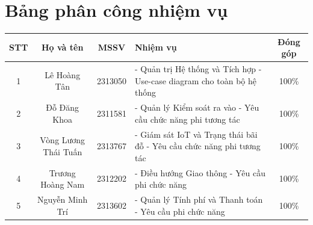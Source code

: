 \section*{Bảng phân công nhiệm vụ}

\begin{table}[htbp]
    \centering
    \renewcommand{\arraystretch}{1.4}
    \begin{tabularx}{\textwidth}{|c|c|c|X|c|}
        \hline
        \textbf{STT} & \textbf{Họ và tên} & \textbf{MSSV} & \textbf{Nhiệm vụ} & \textbf{Đóng góp} \\
        \hline
        1 & Lê Hoàng Tân & 2313050 & 
        - Quản trị Hệ thống và Tích hợp \newline 
        - Use-case diagram cho toàn bộ hệ thống & 100\% \\
        \hline
        2 & Đỗ Đăng Khoa & 2311581 & 
        - Quản lý Kiểm soát ra vào \newline 
        - Yêu cầu chức năng phi tương tác & 100\% \\
        \hline
        3 & Vòng Lương Thái Tuấn & 2313767 & 
        - Giám sát IoT và Trạng thái bãi đỗ \newline 
        - Yêu cầu chức năng phi tương tác & 100\% \\
        \hline
        4 & Trương Hoàng Nam & 2312202 & 
        - Điều hướng Giao thông \newline 
        - Yêu cầu phi chức năng & 100\% \\
        \hline
        5 & Nguyễn Minh Trí & 2313602 & 
        - Quản lý Tính phí và Thanh toán \newline 
        - Yêu cầu phi chức năng & 100\% \\
        \hline
    \end{tabularx}
\end{table}
